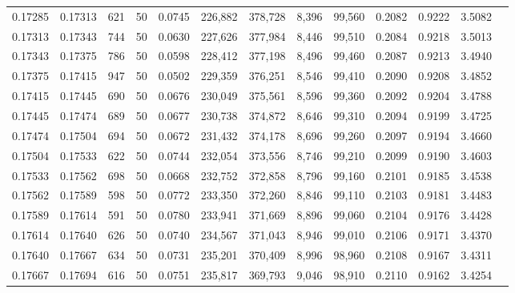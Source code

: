 \begin{tabular}{rrrrrrrrrrrrr}
0.17285 & 0.17313 &   621 &  50 &                                     0.0745 & 226,882 & 378,728 &   8,396 &  99,560 & 0.2082 & 0.9222 & 3.5082 \\
0.17313 & 0.17343 &   744 &  50 &                                     0.0630 & 227,626 & 377,984 &   8,446 &  99,510 & 0.2084 & 0.9218 & 3.5013 \\
0.17343 & 0.17375 &   786 &  50 &                                     0.0598 & 228,412 & 377,198 &   8,496 &  99,460 & 0.2087 & 0.9213 & 3.4940 \\
0.17375 & 0.17415 &   947 &  50 &                                     0.0502 & 229,359 & 376,251 &   8,546 &  99,410 & 0.2090 & 0.9208 & 3.4852 \\
0.17415 & 0.17445 &   690 &  50 &                                     0.0676 & 230,049 & 375,561 &   8,596 &  99,360 & 0.2092 & 0.9204 & 3.4788 \\
0.17445 & 0.17474 &   689 &  50 &                                     0.0677 & 230,738 & 374,872 &   8,646 &  99,310 & 0.2094 & 0.9199 & 3.4725 \\
0.17474 & 0.17504 &   694 &  50 &                                     0.0672 & 231,432 & 374,178 &   8,696 &  99,260 & 0.2097 & 0.9194 & 3.4660 \\
0.17504 & 0.17533 &   622 &  50 &                                     0.0744 & 232,054 & 373,556 &   8,746 &  99,210 & 0.2099 & 0.9190 & 3.4603 \\
0.17533 & 0.17562 &   698 &  50 &                                     0.0668 & 232,752 & 372,858 &   8,796 &  99,160 & 0.2101 & 0.9185 & 3.4538 \\
0.17562 & 0.17589 &   598 &  50 &                                     0.0772 & 233,350 & 372,260 &   8,846 &  99,110 & 0.2103 & 0.9181 & 3.4483 \\
0.17589 & 0.17614 &   591 &  50 &                                     0.0780 & 233,941 & 371,669 &   8,896 &  99,060 & 0.2104 & 0.9176 & 3.4428 \\
0.17614 & 0.17640 &   626 &  50 &                                     0.0740 & 234,567 & 371,043 &   8,946 &  99,010 & 0.2106 & 0.9171 & 3.4370 \\
0.17640 & 0.17667 &   634 &  50 &                                     0.0731 & 235,201 & 370,409 &   8,996 &  98,960 & 0.2108 & 0.9167 & 3.4311 \\
0.17667 & 0.17694 &   616 &  50 &                                     0.0751 & 235,817 & 369,793 &   9,046 &  98,910 & 0.2110 & 0.9162 & 3.4254 \\

\end{tabular}
